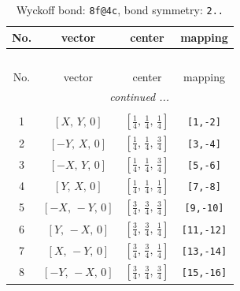 \documentclass[fleqn,8pt]{jsarticle}
\begin{document}
\begin{longtable}{cccc}
\caption{Wyckoff bond: {\tt 8f@4c}, bond symmetry: {\tt 2..}}
 \\
 \hline \hline
No. & vector & center & mapping \\ \hline \endfirsthead

\multicolumn{3}{l}{\tablename\ \thetable{}} \\
 \hline \hline
No. & vector & center & mapping \\ \hline \endhead

 \hline \hline
\multicolumn{3}{r}{\footnotesize\it continued ...} \\ \endfoot

 \hline \hline
\multicolumn{3}{r}{} \\ \endlastfoot

1 & $\left[ X,\, Y,\, 0 \right]$ & $\left[ \frac{1}{4},\, \frac{1}{4},\, \frac{1}{4} \right]$ & {\tt [1,-2]} \\ \hline
2 & $\left[ - Y,\, X,\, 0 \right]$ & $\left[ \frac{1}{4},\, \frac{1}{4},\, \frac{3}{4} \right]$ & {\tt [3,-4]} \\ \hline
3 & $\left[ - X,\, Y,\, 0 \right]$ & $\left[ \frac{1}{4},\, \frac{1}{4},\, \frac{3}{4} \right]$ & {\tt [5,-6]} \\ \hline
4 & $\left[ Y,\, X,\, 0 \right]$ & $\left[ \frac{1}{4},\, \frac{1}{4},\, \frac{1}{4} \right]$ & {\tt [7,-8]} \\ \hline
5 & $\left[ - X,\, - Y,\, 0 \right]$ & $\left[ \frac{3}{4},\, \frac{3}{4},\, \frac{3}{4} \right]$ & {\tt [9,-10]} \\ \hline
6 & $\left[ Y,\, - X,\, 0 \right]$ & $\left[ \frac{3}{4},\, \frac{3}{4},\, \frac{1}{4} \right]$ & {\tt [11,-12]} \\ \hline
7 & $\left[ X,\, - Y,\, 0 \right]$ & $\left[ \frac{3}{4},\, \frac{3}{4},\, \frac{1}{4} \right]$ & {\tt [13,-14]} \\ \hline
8 & $\left[ - Y,\, - X,\, 0 \right]$ & $\left[ \frac{3}{4},\, \frac{3}{4},\, \frac{3}{4} \right]$ & {\tt [15,-16]} \\
\end{longtable}
\renewcommand{\arraystretch}{1.2}
\end{document}
